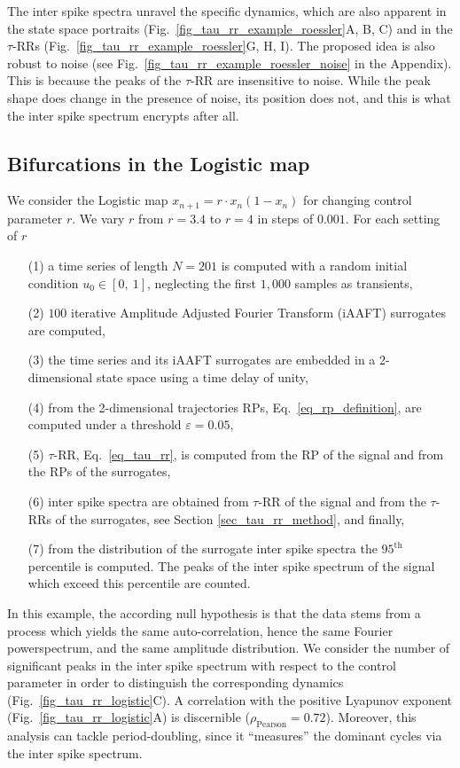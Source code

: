 The inter spike spectra unravel the specific dynamics, which are also apparent in the state space portraits (Fig.~\ref{fig_tau_rr_example_roessler}A, B, C) and in the 
$\tau$-RRs (Fig.~\ref{fig_tau_rr_example_roessler}G, H, I). The proposed idea is also 
robust to noise (see Fig.~\ref{fig_tau_rr_example_roessler_noise} in the Appendix). This is because the peaks of the $\tau$-RR are insensitive to noise. While the peak shape does 
change in the presence of noise, its position does not, and this is what the inter spike spectrum encrypts after all.

\subsection{Bifurcations in the Logistic map}

We consider the Logistic map $x_{n+1}=r\cdot x_n \left( 1-x_n \right)$ for changing control parameter $r$. We vary $r$ from $r=3.4$ to $r=4$ in steps of $0.001$. For 
each setting of $r$ 
\begin{itemize}[noitemsep]
\item[(1)] a time series of length $N=201$ is computed with a random initial condition $u_0 \in [0,\ 1]$, neglecting the first $1,000$ samples as transients,
\item[(2)] $100$ iterative Amplitude Adjusted Fourier Transform (iAAFT) surrogates \cite{Schreiber1996,Schreiber2000} are computed,
\item[(3)] the time series and its iAAFT surrogates are embedded in a 2-dimensional state space using a time delay of unity,
\item[(4)] from the 2-dimensional trajectories RPs, Eq.~\eqref{eq_rp_definition}, are computed under a threshold $\varepsilon=0.05$,
\item[(5)] $\tau$-RR, Eq.~\eqref{eq_tau_rr}, is computed from the RP of the signal and from the RPs of the surrogates,
\item[(6)] inter spike spectra are obtained from $\tau$-RR of the signal and from the $\tau$-RRs of the surrogates, see Section \ref{sec_tau_rr_method}, and finally,
\item[(7)] from the distribution of the surrogate inter spike spectra the $95^\text{th}$ percentile is computed. The peaks of the inter spike spectrum of the signal which exceed 
this percentile are counted. 
\end{itemize}
In this example, the according null hypothesis is that the data stems from a process which yields the same auto-correlation, hence the same Fourier powerspectrum, and the same 
amplitude distribution. We consider the number of significant peaks in the inter spike spectrum with
respect to the control parameter in order to distinguish the corresponding dynamics (Fig.~\ref{fig_tau_rr_logistic}C).
A correlation with the positive Lyapunov exponent (Fig.~\ref{fig_tau_rr_logistic}A) is discernible 
($\rho_{\text{Pearson}}=0.72$). Moreover, this analysis can tackle period-doubling, since it ``measures'' the dominant cycles via the inter spike spectrum. 

